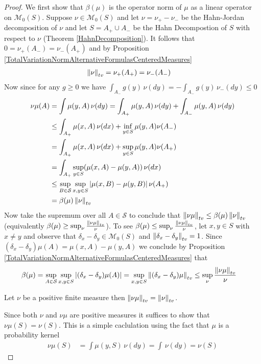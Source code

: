 \begin{proof}
We first show that $\beta(\mu)$ is the operator norm of $\mu$ as a linear operator on $\mathcal{M}_0(S)$. Suppose $\nu \in \mathcal{M}_0(S)$ and let $\nu = \nu_+ - \nu_-$ be the Hahn-Jordan decomposition of $\nu$ and let $S = A_+ \cup A_-$ be the Hahn Decompostion of $S$ 
with respect to $\nu$ (Theorem \ref{HahnDecomposition}).  It follows that $0 = \nu_+(A_-) = \nu_-(A_+)$ and by Proposition \ref{TotalVariationNormAlternativeFormulasCenteredMeasures}
\begin{align*}
\left \lVert  \nu \right \rVert_{tv} &= \nu_+(A_+) = \nu_-(A_-)
\end{align*}
Now since for any $g \geq 0$ we have $\int_{A_-} g(y) \, \nu(dy) = -\int_{A_-} g(y) \, \nu_-(dy) \leq 0$
\begin{align*}
\nu \mu (A) &= \int \mu(y, A) \, \nu(dy) = \int_{A_+} \mu(y, A) \, \nu(dy) + \int_{A_-} \mu(y, A) \, \nu(dy) \\
&\leq \int_{A_+} \mu(x, A) \, \nu(dx) + \inf_{y \in S} \mu(y, A) \nu(A_-) \\
&=\int_{A_+} \mu(x, A) \, \nu(dx) + \sup_{y \in S} \mu(y, A) \nu(A_+) \\
&=\int_{A_+} \sup_{y \in S} (\mu(x, A) - \mu(y,A)) \, \nu(dx) \\
&\leq \sup_{B \in \mathcal{S}} \sup_{x,y \in S} \left \vert \mu(x, B) - \mu(y,B) \right \vert \nu(A_+) \\
&= \beta(\mu) \left \lVert  \nu \right \rVert_{tv} \\
\end{align*}
Now take the supremum over all $A \in \mathcal{S}$ to conclude that $\left \lVert   \nu \mu \right \rVert_{tv} \leq \beta(\mu) \left \lVert  \nu \right \rVert_{tv}$ (equivalently $\beta(\mu) \geq \sup_{\nu} \frac{\left \lVert  \nu \mu \right \rVert_{tv}}{\nu}$).  
To see $\beta(\mu) \leq \sup_{\nu} \frac{\left \lVert  \nu \mu \right \rVert_{tv}}{\nu}$, let $x, y \in S$ with $x \neq y$ and observe that $\delta_x - \delta_y \in \mathcal{M}_0(S)$ and $\left \lVert  \delta_x - \delta_y \right \rVert_{tv} = 1$.
Since $(\delta_x - \delta_y) \mu (A) = \mu(x, A) - \mu(y, A)$ we conclude by Proposition \ref{TotalVariationNormAlternativeFormulasCenteredMeasures} that 
\begin{align*}
\beta(\mu) &= \sup_{A \in \mathcal{S}} \sup_{x, y \in S} \left \vert (\delta_x - \delta_y) \mu (A) \right \vert = \sup_{x, y \in S} \left \lVert  (\delta_x - \delta_y) \mu \right \rVert_{tv} \leq \sup_{\nu} \frac{\left \lVert  \nu \mu \right \rVert_{tv}}{\nu}
\end{align*}

\begin{clm}Let $\nu$ be a positive finite measure then $\left \lVert  \nu \mu \right \rVert_{tv} = \left \lVert  \nu \right \rVert_{tv}$.
\end{clm}
Since both $\nu$ and $\nu \mu$ are positive measures it suffices to show that $\nu \mu (S) = \nu(S)$.  This is a simple caclulation using the fact that $\mu$ is a probability kernel
\begin{align*}
\nu \mu (S) &= \int \mu(y, S) \, \nu(dy) = \int \, \nu(dy) = \nu(S)
\end{align*}


\end{proof}
